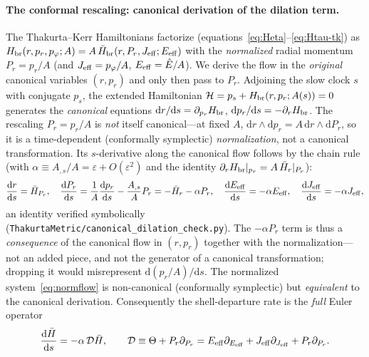 \documentclass[12pt]{iopart}
\theoremstyle{plain}
\theoremstyle{definition}
\theoremstyle{remark}
\newcommand{\Ehat}{\hat E}
\newcommand{\dd}{\mathrm{d}}
\begin{document}
\paragraph{The conformal rescaling: canonical derivation of the dilation term.} The
Thakurta--Kerr Hamiltonians factorize (equations~\eqref{eq:Heta}--\eqref{eq:Htau-tk}) as
$H_{\rm br}(r,p_r,p_\varphi;A)=A\,\bar H_{\rm br}(r,P_r,J_{\rm eff};E_{\rm eff})$ with the
\emph{normalized} radial momentum $P_r=p_r/A$ (and $J_{\rm eff}=p_\varphi/A$,
$E_{\rm eff}=\Ehat/A$). We derive the flow in the \emph{original} canonical variables
$(r,p_r)$ and only then pass to $P_r$. Adjoining the slow clock $s$ with conjugate
$p_s$, the extended Hamiltonian $\mathcal H=p_s+H_{\rm br}(r,p_r;A(s))=0$ generates the
\emph{canonical} equations $\dd r/\dd s=\partial_{p_r}H_{\rm br}$,
$\dd p_r/\dd s=-\partial_r H_{\rm br}$. The rescaling $P_r=p_r/A$ is \emph{not} itself
canonical---at fixed $A$, $\dd r\wedge\dd p_r=A\,\dd r\wedge\dd P_r$, so it is a
time-dependent (conformally symplectic) \emph{normalization}, not a canonical
transformation. Its $s$-derivative along the canonical flow follows by the chain rule
(with $\alpha\equiv A_{,s}/A=\varepsilon+O(\varepsilon^2)$ and the identity
$\partial_r H_{\rm br}|_{p_r}=A\,\bar H_r|_{P_r}$):
\begin{equation}
    \frac{\dd r}{\dd s}=\bar H_{P_r},\quad
    \frac{\dd P_r}{\dd s}=\frac1A\frac{\dd p_r}{\dd s}-\frac{A_{,s}}{A}P_r
      =-\bar H_r-\alpha P_r,\quad
    \frac{\dd E_{\rm eff}}{\dd s}=-\alpha E_{\rm eff},\quad
    \frac{\dd J_{\rm eff}}{\dd s}=-\alpha J_{\rm eff},
    \label{eq:normflow}
\end{equation}
an identity verified symbolically (\texttt{ThakurtaMetric/canonical\_dilation\_check.py}).
The $-\alpha P_r$ term is thus a \emph{consequence} of the canonical flow in $(r,p_r)$
together with the normalization---not an added piece, and not the generator of a
canonical transformation; dropping it would misrepresent $\dd(p_r/A)/\dd s$. The
normalized system~\eqref{eq:normflow} is non-canonical (conformally symplectic) but
\emph{equivalent} to the canonical derivation. Consequently the shell-departure rate is
the \emph{full} Euler operator
\begin{equation}
    \frac{\dd\bar H}{\dd s}=-\alpha\,\mathcal D\bar H,\qquad
    \mathcal D\equiv\Theta+P_r\partial_{P_r}
    =E_{\rm eff}\partial_{E_{\rm eff}}+J_{\rm eff}\partial_{J_{\rm eff}}+P_r\partial_{P_r}.
    \label{eq:Dop}
\end{equation}
\end{document}
